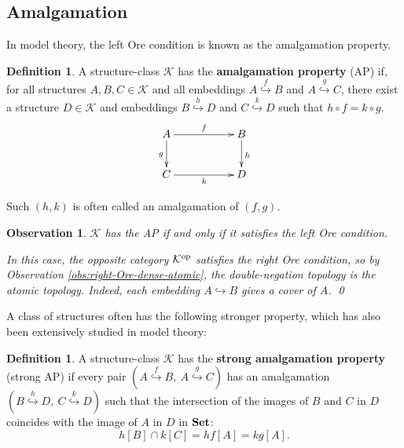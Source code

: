 \documentclass[10pt]{amsart}
\numberwithin{equation}{section}
\theoremstyle{plain}
\newtheorem{obs}[theorem]{Observation}
\theoremstyle{definition}
\newtheorem{definition}[theorem]{Definition}
\newcommand{\embed}{\hookrightarrow}
\newcommand{\embedge}[1]{\overset{#1}{\embed}}
\begin{document}
\subsection{Amalgamation}
In model theory, the left Ore condition is known as the amalgamation property.

\begin{definition}
A structure-class $\mathcal{K}$ has the {\bf amalgamation property} ({\rm AP}) if, for all structures $A,B,C\in\mathcal{K}$ and all embeddings $A\embedge{f}B$ and $A\embedge{g}C$, there exist a structure $D\in\mathcal{K}$ and embeddings $B\embedge{h}D$ and $C\embedge{k}D$ such that $h\circ f=k\circ g$.
\[
\xymatrix{
	A \ar[rr]^f \ar[d]_g & & B \ar[d]^h \\
	C \ar[rr]_k & & D
}
\]
\end{definition}

Such $(h,k)$ is often called an amalgamation of $(f,g)$.

\begin{obs}\label{obs:right-Ore-dense-atomic2}
$\mathcal{K}$ has the {AP} if and only if it satisfies the left Ore condition.

In this case, the opposite category $\mathcal{K}^{\rm op}$ satisfies the right Ore condition, so by Observation \ref{obs:right-Ore-dense-atomic}, the double-negation topology is the atomic topology.
Indeed, each embedding $A\embed B$ gives a cover of $A$.
\qed
\end{obs}



A class of structures often has the following stronger property, which has also been extensively studied in model theory:

\begin{definition}
A structure-class $\mathcal{K}$ has the {\bf strong amalgamation property} (strong AP) if every pair $(A\embedge{f}B,\ A\embedge{g}C)$ has an amalgamation $(B\embedge{h}D,\ C\embedge{k}D)$ such that the intersection of the images of $B$ and $C$ in $D$ coincides with the image of $A$ in $D$ in ${\bf Set}$:
\[h[B]\cap k[C]=hf[A]=kg[A].\]
\end{definition}
\end{document}

